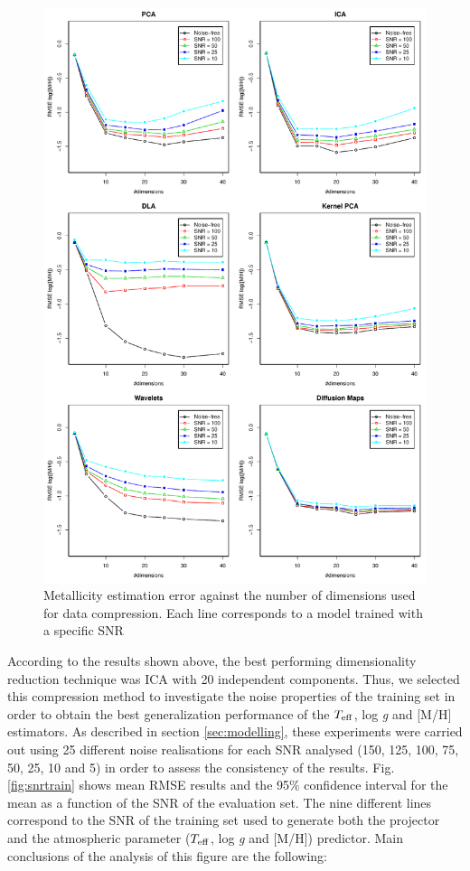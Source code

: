 \documentclass[a4paper,fleqn,usenatbib]{mnras}
\begin{document}
\begin{figure}
\centering\includegraphics[height=0.95\textheight]{flamesHR10_Meta_log_BestSVM_N-SNR-RMSE_test.pdf}
\caption{Metallicity estimation error against the number of dimensions
  used for data compression. Each line corresponds to a model trained
  with a specific SNR}
\label{fig:methodsnrMeta}
\end{figure}

According to the results shown above, the best performing
dimensionality reduction technique was ICA with 20 independent
components. Thus, we selected
this compression method to investigate the noise properties of
  the training set in order to obtain the best generalization
performance of the $T_{\rm eff}$, log \textit{g} and [M/H]
estimators.  As described in section \ref{sec:modelling}, these
experiments were carried out using 25 different noise
  realisations for each SNR analysed (150, 125, 100, 75, 50, 25, 10
and 5) in order to assess the consistency of the results.  Fig.~
\ref{fig:snrtrain} shows mean RMSE results and the 95\% confidence
interval for the mean as a function of the SNR of the evaluation
set. The nine different lines correspond to the SNR of the
training set used to generate both the projector and the atmospheric 
parameter ($T_{\rm eff}$, log \textit{g} and [M/H]) predictor. 
Main conclusions of the analysis of this figure are the
following:
\end{document}
